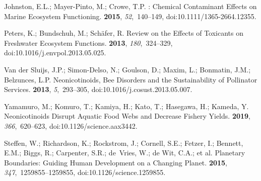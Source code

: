 \documentclass[data,datadescriptor,accept,moreauthors,pdftex]{Definitions/mdpi}
\begin{document}
\begin{thebibliography}{999}
Johnston, E.L.; {Mayer-Pinto}, M.; Crowe, T.P.
: {{Chemical}} Contaminant Effects on Marine Ecosystem
  Functioning.
 {\bf 2015}, {\em 52},~140--149, doi:10.1111/1365-2664.12355.

Peters, K.; Bundschuh, M.; Sch{\"a}fer, R.
\newblock Review on the Effects of Toxicants on Freshwater Ecosystem Functions.
 {\bf 2013}, {\em 180},~324--329, doi:10.1016/j.envpol.2013.05.025.

{Van der Sluijs}, J.P.; {Simon-Delso}, N.; Goulson, D.; Maxim, L.; Bonmatin,
  J.M.; Belzunces, L.P.
\newblock Neonicotinoids, Bee Disorders and the Sustainability of Pollinator
  Services.
 {\bf 2013},
  {\em 5},~293--305, doi:10.1016/j.cosust.2013.05.007.

Yamamuro, M.; Komuro, T.; Kamiya, H.; Kato, T.; Hasegawa, H.; Kameda, Y.
\newblock Neonicotinoids Disrupt Aquatic Food Webs and Decrease Fishery Yields.
 {\bf 2019}, {\em 366},~620--623, doi:10.1126/science.aax3442.


Steffen, W.; Richardson, K.; Rockstrom, J.; Cornell, S.E.; Fetzer, I.; Bennett,
  E.M.; Biggs, R.; Carpenter, S.R.; {de~Vries}, W.; {de Wit}, C.A.; et al.
\newblock Planetary Boundaries: {{Guiding}} Human Development on a Changing
  Planet.
 {\bf 2015}, {\em 347},~1259855--1259855, doi:10.1126/science.1259855.


\end{thebibliography}
\end{document}
